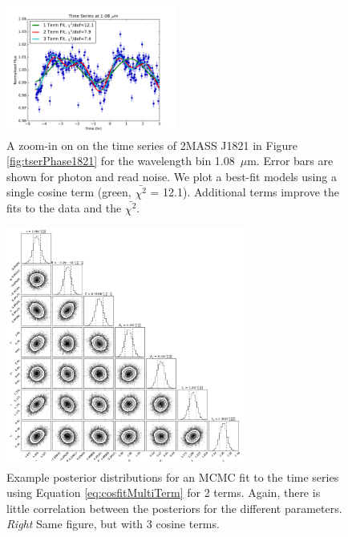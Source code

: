 \documentclass[twocolumn]{aastex6}
\begin{document}
\begin{figure}
\begin{centering}
\includegraphics[width=0.5\textwidth]{best_fit_multi_terms.pdf}
\caption{A zoom-in on on the time series of 2MASS J1821 in Figure \ref{fig:tserPhase1821} for the wavelength bin 1.08~$\mu$m. Error bars are shown for photon and read noise. We plot a best-fit models using a single cosine term (green, $\bar{\chi^2}$ = 12.1). Additional terms improve the fits to the data and the $\bar{\chi^2}$.}\label{fig:model2Cosfit}
\end{centering}
\end{figure}


\begin{figure}
\begin{centering}
\includegraphics[width=0.7\textwidth]{corner_fit_2term.pdf}
\caption{Example posterior distributions for an MCMC fit to the time series using Equation \ref{eq:cosfitMultiTerm} for 2 terms.
Again, there is little correlation between the posteriors for the different parameters. {\it Right} Same figure, but with 3 cosine terms.}\label{fig:post2Cosfit}
\end{centering}
\end{figure}
\end{document}
